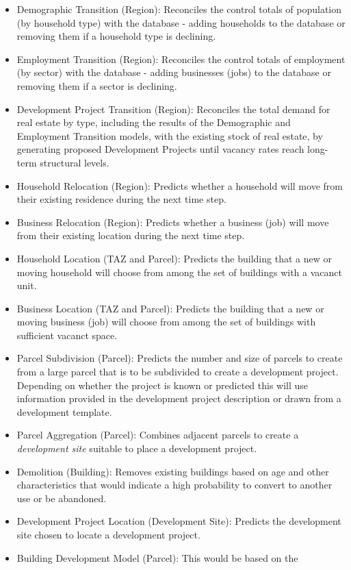 \begin{itemize}
\begin{itemize}
\item Demographic Transition (Region): Reconciles the control totals
of population (by household type) with the database - adding households
to the database or removing them if a household type is declining.
\item Employment Transition (Region): Reconciles the control totals
of employment (by sector) with the database - adding businesses (jobs)
to the database or removing them if a sector is declining.
\item Development Project Transition (Region): Reconciles the total
demand for real estate by type, including the results of the Demographic
and Employment Transition models, with the existing stock of real estate,
by generating proposed Development Projects until vacancy rates reach
long-term structural levels.
\item Household Relocation (Region): Predicts whether a household will
move from their existing residence during the next time step.
\item Business Relocation (Region): Predicts whether a business  (job)
will move from their existing location during the next time step.
\item Household Location (TAZ and Parcel): Predicts the building that
a new or moving household will choose from among the set of buildings
with a vacanct unit.
\item Business Location (TAZ and Parcel): Predicts the building that a
new or moving business (job) will choose from among the set of buildings
with sufficient vacanct space.
\item Parcel Subdivision (Parcel): Predicts the number and size of
parcels to create from a large parcel that is to be subdivided to create
a development project. Depending on whether the project is known or
predicted this will use information provided in the development project
description or drawn from a development template.
\item Parcel Aggregation (Parcel): Combines adjacent parcels to create
a \emph{development site} suitable to place a development project.
\item Demolition (Building): Removes existing buildings based on age
and other characteristics that would indicate a high probability to
convert to another use or be abandoned.
\item Development Project Location (Development Site): Predicts the
development site chosen to locate a development project.
\item Building Development Model (Parcel): This would be based on the

\end{itemize}
\end{itemize}
